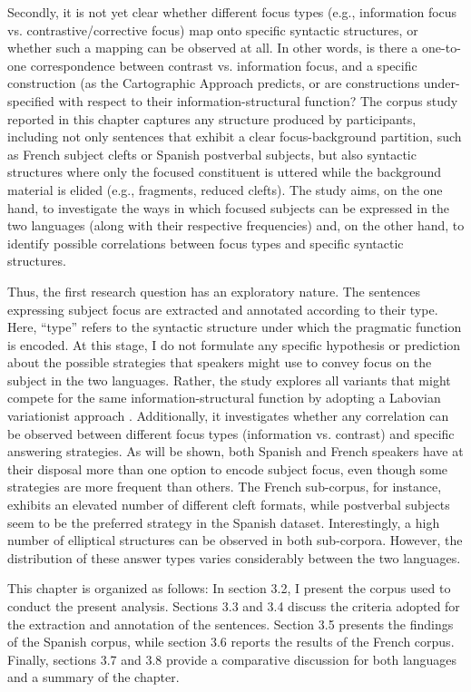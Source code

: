 Secondly, it is not yet clear whether different focus types (e.g., information focus vs. contrastive/corrective focus) map onto specific syntactic structures, or whether such a mapping can be observed at all. In other words, is there a one-to-one correspondence between contrast vs. information focus, and a specific construction (as the Cartographic Approach \parencite{rizzi1997fine} predicts, or are constructions under-specified with respect to their information-structural function? 
The corpus study reported in this chapter captures any structure produced by participants, including not only sentences that exhibit a clear focus-background partition, such as French subject clefts or Spanish postverbal subjects, but also syntactic structures where only the focused constituent is uttered while the background material is elided (e.g., fragments, reduced clefts). The study aims, on the one hand, to investigate the ways in which focused subjects can be expressed in the two languages (along with their respective frequencies) and, on the other hand, to identify possible correlations between focus types and specific syntactic structures.

Thus, the first research question has an exploratory nature. The sentences expressing subject focus are extracted and annotated according to their type. Here, ``type” refers to the syntactic structure under which the pragmatic function is encoded. At this stage, I do not formulate any specific hypothesis or prediction about the possible strategies that speakers might use to convey focus on the subject in the two languages. Rather, the study explores all variants that might compete for the same information-structural function by adopting a Labovian variationist approach \parencite{labov1972sociolinguistic}. Additionally, it investigates whether any correlation can be observed between different focus types (information vs. contrast) and specific answering strategies. As will be shown, both Spanish and French speakers have at their disposal more than one option to encode subject focus, even though some strategies are more frequent than others. The French sub-corpus, for instance, exhibits an elevated number of different cleft formats, while postverbal subjects seem to be the preferred strategy in the Spanish dataset. Interestingly, a high number of elliptical structures can be observed in both sub-corpora. However, the distribution of these answer types varies considerably between the two languages.

This chapter is organized as follows: In section 3.2, I present the corpus used to conduct the present analysis. Sections 3.3 and 3.4 discuss the criteria adopted for the extraction and annotation of the sentences. Section 3.5 presents the findings of the Spanish corpus, while section 3.6 reports the results of the French corpus. Finally, sections 3.7 and 3.8 provide a comparative discussion for both languages and a summary of the chapter. 


